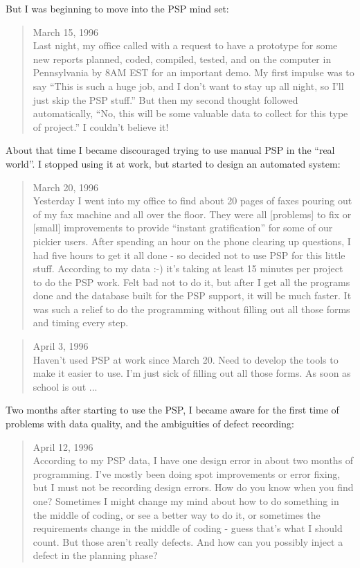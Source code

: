 But I was beginning to move into the PSP mind set:
\begin{quote}
  March 15, 1996\\
  Last night, my office called with a request to have a prototype for some
  new reports planned, coded, compiled, tested, and on the computer in
  Pennsylvania by 8AM EST for an important demo.  My first impulse was to
  say ``This is such a huge job, and I don't want to stay up all night, so
  I'll just skip the PSP stuff.''  But then my second thought followed
  automatically, ``No, this will be some valuable data to collect for this
  type of project.''  I couldn't believe it!
\end{quote}

About that time I became discouraged trying to use manual PSP in the ``real
world''.  I stopped using it at work, but started to design an automated
system:

\begin{quote}
  March 20, 1996\\
  Yesterday I went into my office to find about 20 pages of faxes pouring
  out of my fax machine and all over the floor.  They were all [problems]
  to fix or [small] improvements to provide ``instant gratification'' for
  some of our pickier users.  After spending an hour on the phone clearing
  up questions, I had five hours to get it all done - so decided not to use
  PSP for this little stuff.  According to my data :-) it's taking at least
  15 minutes per project to do the PSP work.  Felt bad not to do it, but
  after I get all the programs done and the database built for the PSP
  support, it will be much faster.  It was such a relief to do the
  programming without filling out all those forms and timing every step.
\end{quote}

\begin{quote}
  April 3, 1996\\
  Haven't used PSP at work since March 20.  Need to develop the tools to
  make it easier to use.  I'm just sick of filling out all those forms.  As
  soon as school is out ...
\end{quote}

Two months after starting to use the PSP, I became aware for the first time 
of problems with data quality, and the ambiguities of defect recording:

\begin{quote}
  April 12, 1996\\
  According to my PSP data, I have one design error in about two months of
  programming.  I've mostly been doing spot improvements or error fixing,
  but I must not be recording design errors.  How do you know when you find
  one?  Sometimes I might change my mind about how to do something in the
  middle of coding, or see a better way to do it, or sometimes the
  requirements change in the middle of coding - guess that's what I should
  count.  But those aren't really defects.  And how can you possibly inject
  a defect in the planning phase?
\end{quote}


